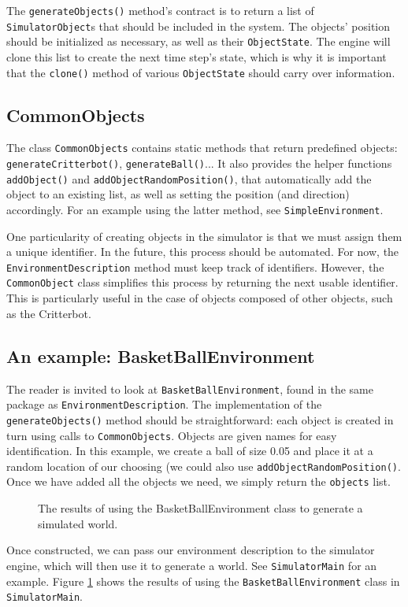 \documentclass[12pt]{article}
\newcommand{\code}[1]{\texttt{#1}}
\begin{document}
The \code{generateObjects()} method's contract is to return a list of 
\code{SimulatorObject}s that should be included in the system. The objects'
position should be initialized as necessary, as well as their 
\code{ObjectState}. The engine will clone this list to create the next time
step's state, which is why it is important that the \code{clone()} method
of various \code{ObjectState} should carry over information.

\subsection{CommonObjects}

The class \code{CommonObjects} contains static methods that return predefined
objects: \code{generateCritterbot()}, \code{generateBall()}... It also provides
the helper functions \code{addObject()} and \code{addObjectRandomPosition()},
that automatically add the object to an existing list, as well as setting
the position (and direction) accordingly. For an example using the latter
method, see \code{SimpleEnvironment}.

One particularity of creating objects in the simulator is that we must assign
them a unique identifier. In the future, this process should be automated.
For now, the \code{EnvironmentDescription} method must keep track of 
identifiers. However, the \code{CommonObject} class simplifies this process
by returning the next usable identifier. This is particularly useful in the
case of objects composed of other objects, such as the Critterbot.

\subsection{An example: BasketBallEnvironment}

The reader is invited to look at \code{BasketBallEnvironment}, found in the
same package as \code{EnvironmentDescription}. The implementation of the
\code{generateObjects()} method should be straightforward: each object
is created in turn using calls to \code{CommonObjects}. Objects are given
names for easy identification. In this example, we create a ball of size
0.05 and place it at a random location of our choosing (we could also use
\code{addObjectRandomPosition()}. Once we have added all the objects we
need, we simply return the \code{objects} list.

\begin{figure}\label{fig:basketball}
\centerline{
}
\caption{The results of using the BasketBallEnvironment class to generate 
a simulated world.}
\end{figure}

Once constructed, we can pass our environment description to the simulator
engine, which will then use it to generate a world. See \code{SimulatorMain}
for an example. Figure \ref{fig:basketball} shows the results of using the
\code{BasketBallEnvironment} class in \code{SimulatorMain}.

\end{document}
